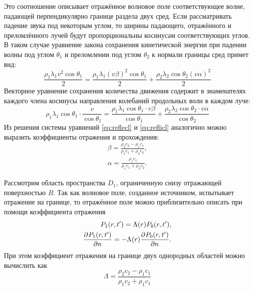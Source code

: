 \documentclass[a4paper, fontsize=14pt]{article}
\begin{document}
	Это соотношение описывает отражённое волновое поле соответствующее  волне, падающей перпендикулярно границе раздела двух сред. 
	Если рассматривать падение звука под некоторым углом, то ширины падающего, отражённого и преломлённого лучей будут  пропорциональны косинусам соответствующих углов.\cite{zakharov} 
	В таком случае уравнение закона сохранения кинетической энергии при падении волны под углом $\theta_1$ и преломлении под углом $\theta_2$ к нормали границы сред примет вид:
	\begin{equation}
		\frac{\rho_1 \lambda_1 v^2 \cos \theta_1}{2} = \frac{\rho_1 \lambda_1 (v\beta)^2 \cos \theta_1}{2} + \frac{\rho_2 \lambda_2 \cos \theta_2 (v\alpha)^2 }{2}
		\label{eq:reflecl}
	\end{equation}
	Векторное уравнение сохранения количества движения содержит в знаменателях каждого члена косинусы направления колебаний продольных волн в каждом луче:
	\begin{equation}
		\rho_1 \lambda_1 \cos \theta_1 \cdot \frac{v}{\cos \theta_1} = \frac{\rho_1 \lambda_1 \cos \theta_1 \cdot v \beta}{\cos \theta_1} + \frac{\rho_2 \lambda_2 \cos \theta_2 \cdot v\alpha}{\cos\theta_2}
		\label{eq:reflicl}
	\end{equation}
	Из решения системы уравнений \ref{eq:reflecl} и \ref{eq:reflicl} аналогично можно выразить коэффициенты отражения и прохождения:
	\begin{gather}
		\beta =  \frac{\rho_2 c_2 - \rho_1 c_1}{\rho_1 c_1 + \rho_2 c_2 },\\
		\alpha =  \frac{\rho_1 c_1}{\rho_1 c_1 + \rho_2 c_2 }.
	\end{gather} 
	
	Рассмотрим область пространства $D_1$, ограниченную снизу отражающей поверхностью $B$. 
	Так как волновое поле, созданное источником, испытывает отражение на границе, то отражённое поле можно приблизительно описать при помощи коэффициента отражения\cite{zhdanov2007}
	\begin{eqnarray}
		P_1(r,t') = \Lambda(r) P_0(r,t'), \label{eq:lambda}\\
		\frac{\partial ^ {  } P_1(r,t') }{\partial n ^ {  } } = - \Lambda(r) \frac{\partial ^ {  } P_0(r,t')}{\partial n ^ {  } }. \label{eq:lambdadnp0}
	\end{eqnarray}
	При этом коэффициент отражения на границе двух однородных областей можно вычислить как
	\begin{equation}
		\Lambda = \frac{\rho_2 c_2-\rho_1 c_1}{\rho_1 c_2+\rho_1 c_1}
		\label{eq:refl}
	\end{equation}

\end{document}
